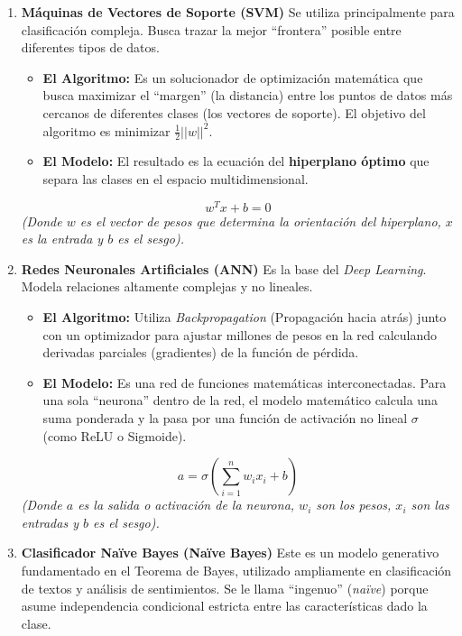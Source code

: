 \begin{enumerate}
\item {\bf Máquinas de Vectores de Soporte (SVM)}
Se utiliza principalmente para clasificación compleja. Busca trazar la mejor ``frontera'' posible entre diferentes tipos de datos.

\begin{itemize}
    \item \textbf{El Algoritmo:} Es un solucionador de optimización matemática que busca maximizar el ``margen'' (la distancia) entre los puntos de datos más cercanos de diferentes clases (los vectores de soporte). El objetivo del algoritmo es minimizar $\frac{1}{2} ||w||^2$.
    \item \textbf{El Modelo:} El resultado es la ecuación del \textbf{hiperplano óptimo} que separa las clases en el espacio multidimensional.
\end{itemize}
\begin{equation}
    w^T x + b = 0
\end{equation}
\textit{(Donde $w$ es el vector de pesos que determina la orientación del hiperplano, $x$ es la entrada y $b$ es el sesgo).}

\item {\bf Redes Neuronales Artificiales (ANN)}
Es la base del \textit{Deep Learning}. Modela relaciones altamente complejas y no lineales.

\begin{itemize}
    \item \textbf{El Algoritmo:} Utiliza \textit{Backpropagation} (Propagación hacia atrás) junto con un optimizador para ajustar millones de pesos en la red calculando derivadas parciales (gradientes) de la función de pérdida.
    \item \textbf{El Modelo:} Es una red de funciones matemáticas interconectadas. Para una sola ``neurona'' dentro de la red, el modelo matemático calcula una suma ponderada y la pasa por una función de activación no lineal $\sigma$ (como ReLU o Sigmoide).
\end{itemize}
\begin{equation}
    a = \sigma\left(\sum_{i=1}^{n} w_i x_i + b\right)
\end{equation}
\textit{(Donde $a$ es la salida o activación de la neurona, $w_i$ son los pesos, $x_i$ son las entradas y $b$ es el sesgo).}

\item {\bf Clasificador Naïve Bayes (Naïve Bayes)}
Este es un modelo generativo fundamentado en el Teorema de Bayes, utilizado ampliamente en clasificación de textos y análisis de sentimientos. Se le llama ``ingenuo'' (\textit{naïve}) porque asume independencia condicional estricta entre las características dado la clase.


\end{enumerate}
